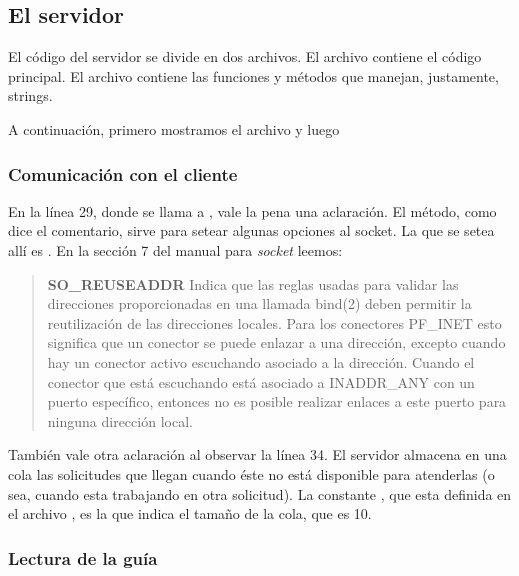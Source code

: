 \subsection{El servidor}

El código del servidor se divide en dos archivos. El archivo
 contiene el código principal. El archivo
 contiene las funciones y métodos que manejan, justamente,
strings.

A continuación, primero mostramos el archivo  y luego



\subsubsection{Comunicación con el cliente}

En la línea 29, donde se llama a , vale la pena una
aclaración. El método, como dice el comentario, sirve para setear algunas
opciones al socket. La que se setea allí es . En la
sección 7 del manual para \emph{socket} leemos:

\begin{quote}

\textbf{SO\_REUSEADDR}\linebreak
Indica que las reglas usadas para validar las direcciones proporcionadas en una
llamada bind(2) deben permitir la reutilización  de  las direcciones  locales.
Para  los conectores PF\_INET esto significa que un conector se puede enlazar a
una dirección, excepto cuando hay un conector activo escuchando asociado a la
dirección. Cuando el conector que está escuchando está asociado a INADDR\_ANY
con un puerto específico, entonces no es posible realizar enlaces a este puerto
para ninguna dirección local.

\end{quote}

También vale otra aclaración al observar la línea 34. El servidor almacena en
una cola las solicitudes que llegan cuando éste no está disponible para
atenderlas (o sea, cuando esta trabajando en otra solicitud). La constante
, que esta definida en el archivo , es la
que indica el tamaño de la cola, que es 10.

\subsubsection{Lectura de la guía}

